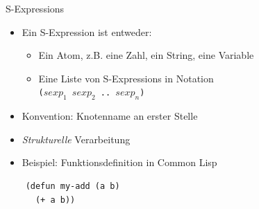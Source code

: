\documentclass{beamer}
\begin{document}
\begin{frame}[fragile]{S-Expressions}
  \begin{itemize}
  \item Ein S-Expression ist entweder:
    \begin{itemize}
    \item Ein Atom, z.B. eine Zahl, ein String, eine Variable
    \item Eine Liste von S-Expressions in Notation \\ \texttt{($sexp_1$ $sexp_2$ .. $sexp_n$)}
    \end{itemize}
  \item Konvention: Knotenname an erster Stelle
  \item \textit{Strukturelle} Verarbeitung
  \item Beispiel: Funktionsdefinition in Common Lisp
  \end{itemize}
\begin{verbatim}
    (defun my-add (a b)
      (+ a b))
\end{verbatim}
\end{frame}
\end{document}
